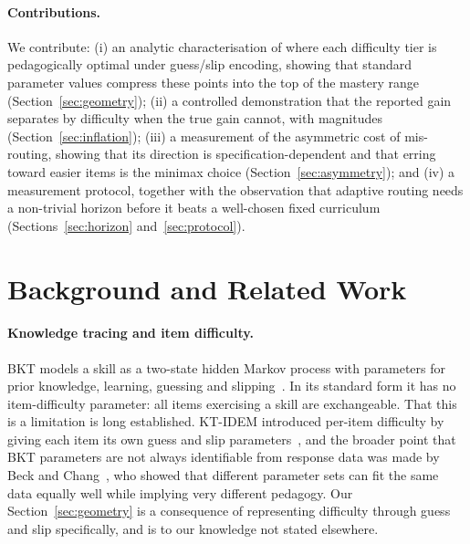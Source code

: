 \documentclass[notitlepage,12pt]{jedm}
\begin{document}
\paragraph{Contributions.} We contribute: (i) an analytic characterisation of where each difficulty tier is pedagogically optimal under guess/slip encoding, showing that standard parameter values compress these points into the top of the mastery range (Section~\ref{sec:geometry}); (ii) a controlled demonstration that the reported gain separates by difficulty when the true gain cannot, with magnitudes (Section~\ref{sec:inflation}); (iii) a measurement of the asymmetric cost of mis-routing, showing that its direction is specification-dependent and that erring toward easier items is the minimax choice (Section~\ref{sec:asymmetry}); and (iv) a measurement protocol, together with the observation that adaptive routing needs a non-trivial horizon before it beats a well-chosen fixed curriculum (Sections~\ref{sec:horizon} and~\ref{sec:protocol}).

\section{Background and Related Work}

\paragraph{Knowledge tracing and item difficulty.} BKT models a skill as a two-state hidden Markov process with parameters for prior knowledge, learning, guessing and slipping~\cite{corbett1995knowledge}. In its standard form it has no item-difficulty parameter: all items exercising a skill are exchangeable. That this is a limitation is long established. KT-IDEM introduced per-item difficulty by giving each item its own guess and slip parameters~\cite{pardos2011ktidem}, and the broader point that BKT parameters are not always identifiable from response data was made by Beck and Chang~\cite{beck2007identifiability}, who showed that different parameter sets can fit the same data equally well while implying very different pedagogy. Our Section~\ref{sec:geometry} is a consequence of representing difficulty through guess and slip specifically, and is to our knowledge not stated elsewhere.
\end{document}
